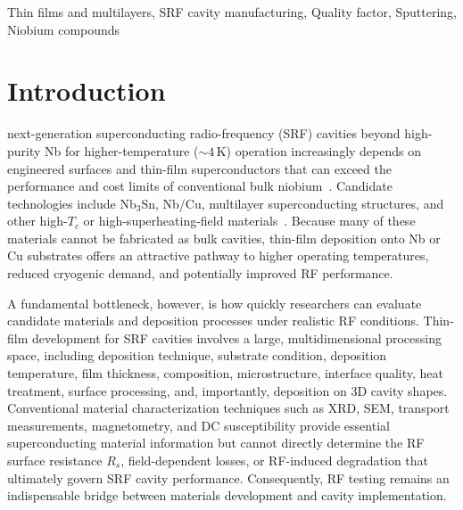 \documentclass[letterpaper,journal]{IEEEtran}
\newcommand{\SI}[2]{\ensuremath{#1\,\text{#2}}}
\newcommand{\kelvin}{K}
\begin{document}
\begin{IEEEkeywords}
Thin films and multilayers, SRF cavity manufacturing, Quality factor, Sputtering, Niobium compounds
\end{IEEEkeywords}

\section{Introduction}
\label{sec:intro}
 next-generation superconducting radio-frequency (SRF) cavities beyond high-purity Nb for higher-temperature ($\sim$\SI{4}{\kelvin}) operation increasingly depends on engineered surfaces and thin-film superconductors that can exceed the performance and cost limits of conventional bulk niobium~\cite{valenteFelicianoReview2016}. Candidate technologies include Nb$_3$Sn, Nb/Cu, multilayer superconducting structures, and other high-$T_c$ or high-superheating-field materials~\cite{valenteFelicianoReview2016, posen2023HighQ}. Because many of these materials cannot be fabricated as bulk cavities, thin-film deposition onto Nb or Cu substrates offers an attractive pathway to higher operating temperatures, reduced cryogenic demand, and potentially improved RF performance.

A fundamental bottleneck, however, is how quickly researchers can evaluate candidate materials and deposition processes under realistic RF conditions. Thin-film development for SRF cavities involves a large, multidimensional processing space, including deposition technique, substrate condition, deposition temperature, film thickness, composition, microstructure, interface quality, heat treatment, surface processing, and, importantly, deposition on 3D cavity shapes. Conventional material characterization techniques such as XRD, SEM, transport measurements, magnetometry, and DC susceptibility provide essential superconducting material information but cannot directly determine the RF surface resistance $R_{s}$, field-dependent losses, or RF-induced degradation that ultimately govern SRF cavity performance. Consequently, RF testing remains an indispensable bridge between materials development and cavity implementation.
\end{document}
